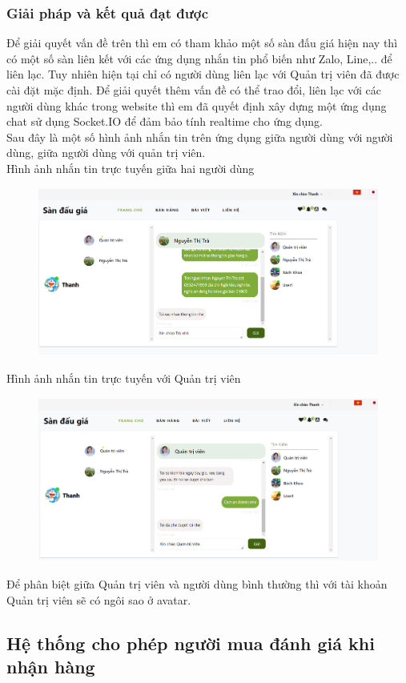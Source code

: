 \documentclass{article}
\begin{document}
\subsubsection{Giải pháp và kết quả đạt được}
Để giải quyết vấn đề trên thì em có tham khảo một số sàn đấu giá hiện nay thì có một số sàn liên kết với các ứng dụng nhắn tin phổ biến như Zalo, Line,.. để liên lạc. Tuy nhiên hiện tại chỉ có người dùng liên lạc với Quản trị viên đã được cài đặt mặc định. Để giải quyết thêm vấn đề có thể trao đổi, liên lạc với các người dùng khác trong website thì em đã quyết định xây dựng một ứng dụng chat sử dụng Socket.IO để đảm bảo tính realtime cho ứng dụng.\\ 
Sau đây là một số hình ảnh nhắn tin trên ứng dụng giữa người dùng với người dùng, giữa người dùng với quản trị viên. \\
Hình ảnh nhắn tin trực tuyến giữa hai người dùng
\begin{figure}[H]
    \centering
    \includegraphics[width=11.4cm,height=5.55cm]{images/chatuser.png}
\end{figure}
Hình ảnh nhắn tin trực tuyến với Quản trị viên
\begin{figure}[H]
    \centering
    \includegraphics[width=11.4cm,height=5.42cm]{images/chatadmin.png}
\end{figure}
Để phân biệt giữa Quản trị viên và người dùng bình thường thì với tài khoản Quản trị viên sẽ có ngôi sao ở avatar.
\subsection{Hệ thống cho phép người mua đánh giá khi nhận hàng}
\end{document}
